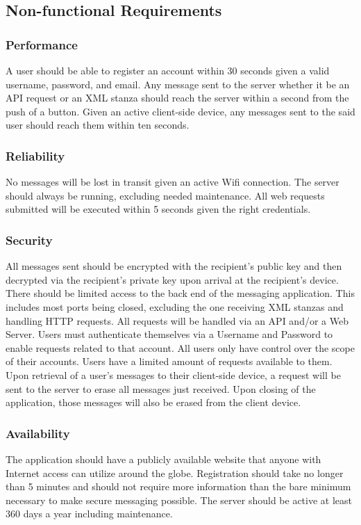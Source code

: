 \documentclass[11pt]{article}
\theoremstyle{plain}
\theoremstyle{definition}
\begin{document}
\subsection{Non-functional Requirements}\label{sec:nonfuncrequirements}
\subsubsection{Performance}
A user should be able to register an account within 30 seconds given a valid username, password, and email. Any message sent to the server whether it be an API request or an XML stanza should reach the server within a second from the push of a button. Given an active client-side device, any messages sent to the said user should reach them within ten seconds.
\subsubsection{Reliability}
No messages will be lost in transit given an active Wifi connection. The server should always be running, excluding needed maintenance. All web requests submitted will be executed within 5 seconds given the right credentials.
\subsubsection{Security}
All messages sent should be encrypted with the recipient's public key and then decrypted via the recipient's private key upon arrival at the recipient's device. There should be limited access to the back end of the messaging application. This includes most ports being closed, excluding the one receiving XML stanzas and handling HTTP requests. All requests will be handled via an API and/or a Web Server. Users must authenticate themselves via a Username and Password to enable requests related to that account. All users only have control over the scope of their accounts. Users have a limited amount of requests available to them. Upon retrieval of a user's messages to their client-side device, a request will be sent to the server to erase all messages just received. Upon closing of the application, those messages will also be erased from the client device.
\subsubsection{Availability}
The application should have a publicly available website that  anyone with Internet access can utilize around the globe. Registration should take no longer than 5 minutes and should not require more information than the bare minimum necessary to make secure messaging possible. The server should be active at least 360 days a year including maintenance.
\end{document}
